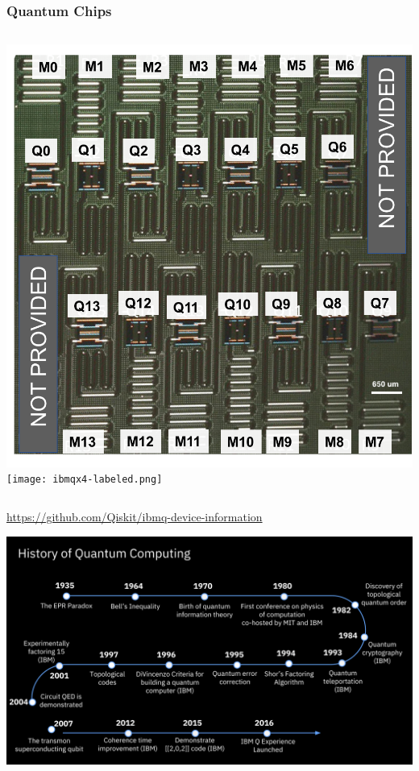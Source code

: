 \documentclass[aspectratio=169,11pt,hyperref={colorlinks=true}]{beamer}
\begin{document}
\begin{frame}
    \frametitle{Quantum Chips}
    \begin{columns}
            \includegraphics[width=\textwidth]{melbourne-labeled.png}
            \texttt{[image: ibmqx4-labeled.png]}
    \end{columns}
    \centering
    \href{https://github.com/Qiskit/ibmq-device-information}{https://github.com/Qiskit/ibmq-device-information}
\end{frame}

\begin{frame}
    \includegraphics[width=\textwidth]{timeline.png}
\end{frame}
\end{document}
